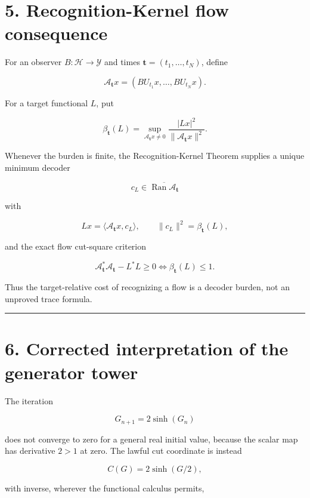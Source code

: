 \hypertarget{recognition-kernel-flow-consequence}{%
\section{5. Recognition-Kernel flow consequence}\label{recognition-kernel-flow-consequence}}

For an observer \(B:\mathcal H\to\mathcal Y\) and times
\(\mathbf t=(t_1,\ldots,t_N)\), define

\[
\mathcal A_{\mathbf t}x
=
(BU_{t_1}x,\ldots,BU_{t_N}x).
\tag{5.1}
\]

For a target functional \(L\), put

\[
\beta_{\mathbf t}(L)
=
\sup_{\mathcal A_{\mathbf t}x\ne0}
\frac{|Lx|^2}{\|\mathcal A_{\mathbf t}x\|^2}.
\tag{5.2}
\]

Whenever the burden is finite, the Recognition-Kernel Theorem supplies a
unique minimum decoder

\[
c_L\in\overline{\operatorname{Ran}\mathcal A_{\mathbf t}}
\]

with

\[
Lx=\langle\mathcal A_{\mathbf t}x,c_L\rangle,
\qquad
\|c_L\|^2=\beta_{\mathbf t}(L),
\tag{5.3}
\]

and the exact flow cut-square criterion

\[
\boxed{
\mathcal A_{\mathbf t}^*\mathcal A_{\mathbf t}-L^*L\ge0
\iff
\beta_{\mathbf t}(L)\le1.
}
\tag{5.4}
\]

Thus the target-relative cost of recognizing a flow is a decoder burden, not an
unproved trace formula.

\begin{center}\rule{0.5\linewidth}{0.5pt}\end{center}

\hypertarget{corrected-interpretation-of-the-generator-tower}{%
\section{6. Corrected interpretation of the generator tower}\label{corrected-interpretation-of-the-generator-tower}}

The iteration

\[
G_{n+1}=2\sinh(G_n)
\]

does not converge to zero for a general real initial value, because the scalar
map has derivative \(2>1\) at zero. The lawful cut coordinate is instead

\[
C(G)=2\sinh(G/2),
\]

with inverse, wherever the functional calculus permits,

